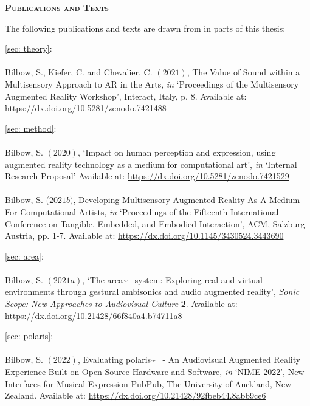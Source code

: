\newpage
{}
\begin{flushleft}
	\Huge \textsc{\textbf{Publications and Texts}}

\end{flushleft}
\noindent The following publications and texts are drawn from in parts of this thesis:

\noindent\autoref{sec: theory}:  \\ \citep{bilbow2021} \\ Bilbow, S., Kiefer, C. and Chevalier, C. $(2021)$, The Value of Sound within a Multisensory Approach to AR in the Arts, \textit{in} `Proceedings of the Multisensory Augmented Reality Workshop', Interact, Italy, p. 8. Available at: \url{https://dx.doi.org/10.5281/zenodo.7421488}
    
\vspace*{0.75cm}
\noindent\autoref{sec: method}:  \\ \citep{bilbow2020,bilbow2021b} \\ Bilbow, S. $(2020)$, `Impact on human perception and expression, using augmented reality technology as a medium for computational art', \textit{in} `Internal Research Proposal' Available at: \url{https://dx.doi.org/10.5281/zenodo.7421529} \\ \\ Bilbow, S. ($2021b)$, Developing Multisensory Augmented Reality As A Medium For Computational Artists, \textit{in} `Proceedings of the Fifteenth International Conference on Tangible, Embedded, and Embodied Interaction', ACM, Salzburg Austria, pp. 1-7. Available at: \url{https://dx.doi.org/10.1145/3430524.3443690}
    
\vspace*{0.75cm}
\noindent\autoref{sec: area}:  \\ \citep{bilbow2021a} \\ Bilbow, S. $(2021a)$, `The area\textasciitilde{}~ system: Exploring real and virtual environments through gestural ambisonics and audio augmented reality', \textit{Sonic Scope: New Approaches to Audiovisual Culture} \textbf{2}. Available at: \url{https://dx.doi.org/10.21428/66f840a4.b74711a8}
    
\vspace*{0.75cm}
\noindent\autoref{sec: polaris}:  \\ \citep{bilbow2022} \\ Bilbow, S. $(2022)$, Evaluating polaris\textasciitilde{}~ - An Audiovisual Augmented Reality Experience Built on Open-Source Hardware and Software, \textit{in} `NIME 2022', New Interfaces for Musical Expression PubPub, The University of Auckland, New Zealand. Available at: \url{https://dx.doi.org/10.21428/92fbeb44.8abb9ce6}